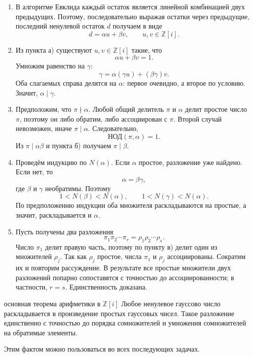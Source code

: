 \begin{enumerate}[label=\textbf{\alph*)}, leftmargin=8mm]
    \item В алгоритме Евклида каждый остаток является линейной
    комбинацией двух предыдущих. Поэтому, последовательно выражая
    остатки через предыдущие, последний ненулевой остаток $d$ получаем
    в виде
    \[
        d=\alpha u+\beta v,
        \qquad u,v\in\mathbb Z[i].
    \]

    \item Из пункта а) существуют $u,v\in\mathbb Z[i]$ такие, что
    \[
        \alpha u+\beta v=1.
    \]
    Умножим равенство на $\gamma$:
    \[
        \gamma=\alpha(\gamma u)+(\beta\gamma)v.
    \]
    Оба слагаемых справа делятся на $\alpha$: первое очевидно, а второе
    по условию. Значит, $\alpha\mid\gamma$.

    \item Предположим, что $\pi\nmid\alpha$. Любой общий делитель
    $\pi$ и $\alpha$ делит простое число $\pi$, поэтому он либо обратим,
    либо ассоциирован с $\pi$. Второй случай невозможен, иначе
    $\pi\mid\alpha$. Следовательно,
    \[
        \text{НОД}(\pi,\alpha)=1.
    \]
    Из $\pi\mid\alpha\beta$ и пункта б) получаем $\pi\mid\beta$.

    \item Проведём индукцию по $N(\alpha)$. Если $\alpha$ простое,
    разложение уже найдено. Если нет, то
    \[
        \alpha=\beta\gamma,
    \]
    где $\beta$ и $\gamma$ необратимы. Поэтому
    \[
        1<N(\beta)<N(\alpha),
        \qquad
        1<N(\gamma)<N(\alpha).
    \]
    По предположению индукции оба множителя раскладываются на простые,
    а значит, раскладывается и $\alpha$.

    \item Пусть получены два разложения
    \[
        \pi_1\pi_2\dotsm\pi_r
        =\rho_1\rho_2\dotsm\rho_s.
    \]
    Число $\pi_1$ делит правую часть, поэтому по пункту в) делит один
    из множителей $\rho_j$. Так как $\rho_j$ простое, числа $\pi_1$ и
    $\rho_j$ ассоциированы. Сократим их и повторим рассуждение.
    В результате все простые множители двух разложений попарно
    сопоставятся с точностью до ассоциированности; в частности,
    $r=s$. Единственность доказана.
\end{enumerate}

\begin{factbox}{основная теорема арифметики в $\mathbb Z[i]$}
Любое ненулевое гауссово число раскладывается в произведение простых
гауссовых чисел. Такое разложение единственно с точностью до порядка
сомножителей и умножения сомножителей на обратимые элементы.

Этим фактом можно пользоваться во всех последующих задачах.
\end{factbox}

